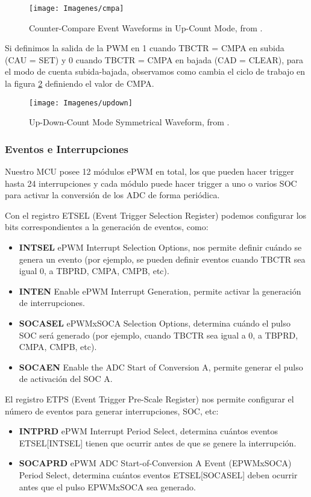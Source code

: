 \begin{figure}[H]
	\centering
	\texttt{[image: Imagenes/cmpa]}
	\caption{Counter-Compare Event Waveforms in Up-Count Mode, from \cite[page 1886]{tmr}.}
	\label{fig:9}
\end{figure}

Si definimos la salida de la PWM en 1 cuando TBCTR = CMPA en subida (CAU = SET) y 0 cuando TBCTR = CMPA en bajada (CAD = CLEAR), para el modo de cuenta subida-bajada, observamos como cambia el ciclo de trabajo en la figura \ref{fig:10} definiendo el valor de CMPA.

\begin{figure}[H]
	\centering
	\texttt{[image: Imagenes/updown]}
	\caption{Up-Down-Count Mode Symmetrical Waveform, from \cite[page 1896]{tmr}.}
	\label{fig:10}
\end{figure}

\subsubsection{Eventos e Interrupciones}
Nuestro MCU posee 12 módulos ePWM en total, los que pueden hacer trigger hasta 24 interrupciones y cada módulo puede hacer trigger a uno o varios SOC para activar la conversión de los ADC de forma periódica.\par
Con el registro ETSEL (Event Trigger Selection Register) podemos configurar los bits correspondientes a la generación de eventos, como:
\begin{itemize}
\item \textbf{INTSEL} ePWM Interrupt Selection Options, nos permite definir cuándo se genera un evento (por ejemplo, se pueden definir eventos cuando TBCTR sea igual 0, a TBPRD, CMPA, CMPB, etc).
\item \textbf{INTEN} Enable ePWM Interrupt Generation, permite activar la generación de interrupciones.
\item \textbf{SOCASEL} ePWMxSOCA Selection Options, determina cuándo el pulso SOC será generado (por ejemplo, cuando TBCTR sea igual a 0, a TBPRD, CMPA, CMPB, etc).
\item \textbf{SOCAEN} Enable the ADC Start of Conversion A, permite generar el pulso de activación del SOC A.
\end{itemize}

El registro ETPS (Event Trigger Pre-Scale Register) nos permite configurar el número de eventos para generar interrupciones, SOC, etc:
\begin{itemize}
\item \textbf{INTPRD} ePWM Interrupt Period Select, determina cuántos eventos ETSEL[INTSEL] tienen que ocurrir antes de que se genere la interrupción.
\item \textbf{SOCAPRD} ePWM ADC Start-of-Conversion A Event (EPWMxSOCA) Period
Select, determina cuántos eventos ETSEL[SOCASEL] deben ocurrir antes que el pulso EPWMxSOCA sea generado.
\end{itemize}



